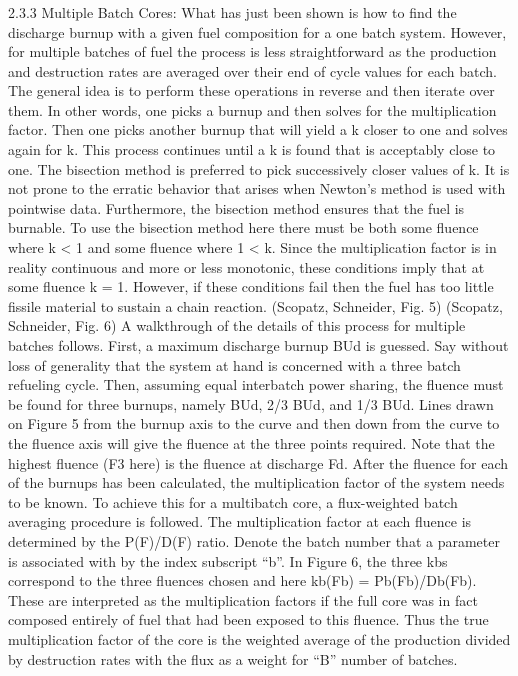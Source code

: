 \subsubsection{}
\label{1g_sec:}
2.3.3 Multiple Batch Cores:
What has just been shown is how to find the discharge burnup with a given fuel composition for a one batch system.  However, for multiple batches of fuel the process is less straightforward as the production and destruction rates are averaged over their end of cycle values for each batch.  The general idea is to perform these operations in reverse and then iterate over them.  In other words, one picks a burnup and then solves for the multiplication factor.  Then one picks another burnup that will yield a k closer to one and solves again for k.  This process continues until a k is found that is acceptably close to one.  
The bisection method is preferred to pick successively closer values of k.  It is not prone to the erratic behavior that arises when Newton’s method is used with pointwise data.   Furthermore, the bisection method ensures that the fuel is burnable.  To use the bisection method here there must be both some fluence where k < 1 and some fluence where 1 < k.  Since the multiplication factor is in reality continuous and more or less monotonic, these conditions imply that at some fluence k = 1.  However, if these conditions fail then the fuel has too little fissile material to sustain a chain reaction. 
(Scopatz, Schneider, Fig. 5) 
(Scopatz, Schneider, Fig. 6)
A walkthrough of the details of this process for multiple batches follows.  First, a maximum discharge burnup BUd is guessed.  Say without loss of generality that the system at hand is concerned with a three batch refueling cycle.  Then, assuming equal interbatch power sharing, the fluence must be found for three burnups, namely BUd, 2/3 BUd, and 1/3 BUd.   Lines drawn on Figure 5 from the burnup axis to the curve and then down from the curve to the fluence axis will give the fluence at the three points required.  Note that the highest fluence (F3 here) is the fluence at discharge Fd.  After the fluence for each of the burnups has been calculated, the multiplication factor of the system needs to be known. 
To achieve this for a multibatch core, a flux-weighted batch averaging procedure is followed.  The multiplication factor at each fluence is determined by the P(F)/D(F) ratio.  Denote the batch number that a parameter is associated with by the index subscript “b”.  In Figure 6, the three kbs correspond to the three fluences chosen and here kb(Fb) = Pb(Fb)/Db(Fb).  These are interpreted as the multiplication factors if the full core was in fact composed entirely of fuel that had been exposed to this fluence. Thus the true multiplication factor of the core is the weighted average of the production divided by destruction rates with the flux as a weight for “B” number of batches.
